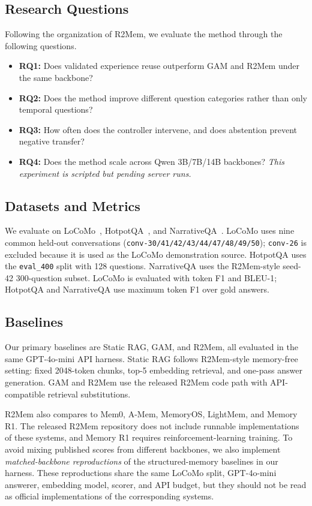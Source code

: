 \documentclass[conference]{IEEEtran}
\begin{document}
\subsection{Research Questions}
Following the organization of R2Mem, we evaluate the method through the
following questions.
\begin{itemize}
    \item \textbf{RQ1:} Does validated experience reuse outperform GAM and
    R2Mem under the same backbone?
    \item \textbf{RQ2:} Does the method improve different question categories
    rather than only temporal questions?
    \item \textbf{RQ3:} How often does the controller intervene, and does
    abstention prevent negative transfer?
    \item \textbf{RQ4:} Does the method scale across Qwen 3B/7B/14B backbones?
    \emph{This experiment is scripted but pending server runs.}
\end{itemize}

\subsection{Datasets and Metrics}
We evaluate on LoCoMo~\cite{locomo}, HotpotQA~\cite{hotpotqa}, and
NarrativeQA~\cite{narrativeqa}. LoCoMo uses nine common held-out conversations
(\texttt{conv-30/41/42/43/44/47/48/49/50}); \texttt{conv-26} is excluded
because it is used as the LoCoMo demonstration source. HotpotQA uses the
\texttt{eval\_400} split with 128 questions. NarrativeQA uses the R2Mem-style
seed-42 300-question subset. LoCoMo is evaluated with token F1 and BLEU-1;
HotpotQA and NarrativeQA use maximum token F1 over gold answers.

\subsection{Baselines}
Our primary baselines are Static RAG, GAM, and R2Mem, all evaluated in the
same GPT-4o-mini API harness. Static RAG follows R2Mem-style memory-free setting:
fixed 2048-token chunks, top-5 embedding retrieval, and one-pass answer
generation. GAM and R2Mem use the released R2Mem code path with API-compatible
retrieval substitutions.

R2Mem also compares to Mem0, A-Mem, MemoryOS, LightMem, and Memory R1. The
released R2Mem repository does not include runnable implementations of these
systems, and Memory R1 requires reinforcement-learning training. To avoid
mixing published scores from different backbones, we also implement
\emph{matched-backbone reproductions} of the structured-memory baselines in
our harness. These reproductions share the same LoCoMo split, GPT-4o-mini
answerer, embedding model, scorer, and API budget, but they should not be read
as official implementations of the corresponding systems.
\end{document}
